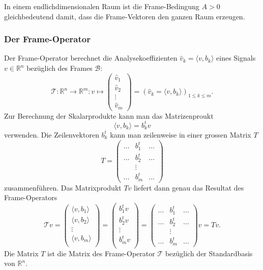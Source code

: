 In einem endlichdimensionalen Raum ist die Frame-Bedingung $A>0$ 
gleichbedeutend damit, dass die Frame-Vektoren den ganzen Raum erzeugen.

\subsubsection{Der Frame-Operator}
Der Frame-Operator berechnet die Analysekoeffizienten
$\hat{v}_k=\langle v,b_k\rangle$ eines Signals
$v\in \mathbb R^n$ bezüglich des Frames $\mathcal{B}$:
\[
\mathcal{T}\colon \mathbb R^n \to \mathbb R^m
:
v \mapsto
\begin{pmatrix}
\hat{v}_1\\\hat{v}_2\\\vdots\\\hat{v}_m
\end{pmatrix}
=
(\hat{v}_k=\langle v,b_k\rangle)_{1\le k\le m}.
\]
Zur Berechnung der Skalarprodukte kann man das Matrizenproukt
\[
\langle v,b_k\rangle
=
b_k^t v
\]
verwenden.
Die Zeilenvektoren $b_k^t$ kann man zeilenweise in einer grossen Matrix $T$
\[
T 
=
\begin{pmatrix}
\dots&b_1^t &\dots\\
\dots&b_2^t &\dots\\
     &\vdots&     \\
\dots&b_m^t &\dots
\end{pmatrix}
\]
zusammenführen.
Das Matrixprodukt $Tv$ liefert dann genau das Resultat des Frame-Operators
\[
\mathcal{T} v
=
\begin{pmatrix}
\langle v, b_1\rangle\\
\langle v, b_2\rangle\\
\vdots\\
\langle v, b_m\rangle\\
\end{pmatrix}
=
\begin{pmatrix}
b_1^tv\\
b_2^tv\\
\vdots\\
b_m^tv\\
\end{pmatrix}
=
\begin{pmatrix}
\dots&b_1^t &\dots\\
\dots&b_2^t &\dots\\
     &\vdots&     \\
\dots&b_m^t &\dots
\end{pmatrix}
v
=
Tv.
\]
Die Matrix $T$ ist die Matrix des Frame-Operator $\mathcal T$ bezüglich der
Standardbasis von $\mathbb R^n$.

